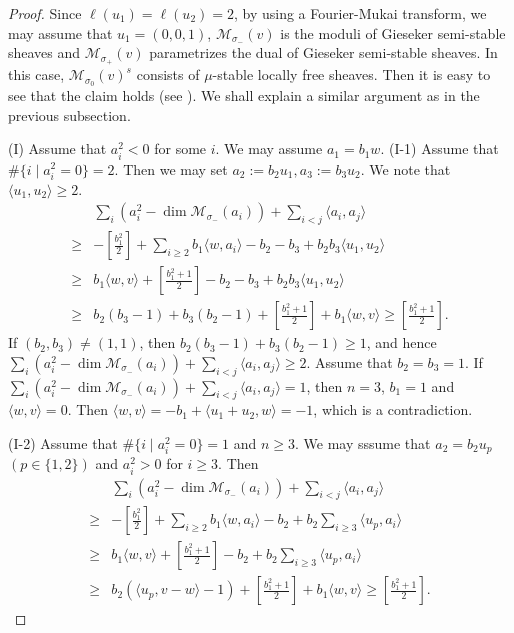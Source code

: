 \documentclass[leqno,11pt]{amsart}
\def\dim{\mathop{\mathrm{dim}}\nolimits}
\theoremstyle{definition}
\def\MM{\ensuremath{\mathcal M}}
\begin{document}
\begin{proof}
Since $\ell(u_1)=\ell(u_2)=2$,
by using a Fourier-Mukai transform,
we may assume that $u_1=(0,0,1)$, 
$\MM_{\sigma_-}(v)$ is the moduli of Gieseker semi-stable
sheaves and $\MM_{\sigma_+}(v)$ parametrizes the dual
of Gieseker semi-stable sheaves.
In this case, $\MM_{\sigma_0}(v)^s$ consists of $\mu$-stable locally free sheaves.
Then it is easy to see that the claim holds (see \cite[Thm. 2.1 Case B]{Yos16a}). 
We shall explain a similar argument as in the previous subsection. 

(I) Assume that $a_i^2<0$ for some $i$.
We may assume $a_1=b_1 w$.
(I-1)
Assume that $\#\{i \mid a_i^2=0 \}=2$.
Then we may set $a_2:=b_2 u_1, a_3:=b_3 u_2$.
We note that $\langle u_1,u_2 \rangle \geq 2$.
\begin{equation}
\begin{split}
& \sum_i(a_i^2-\dim \MM_{\sigma_-}(a_i))+\sum_{i<j}\langle a_i,a_j \rangle\\
 \geq & -[\tfrac{b_1^2}{2}]+\sum_{i \geq 2} b_1 \langle w,a_i \rangle
-b_2-b_3+b_2 b_3 \langle u_1,u_2 \rangle\\
\geq &  b_1 \langle w,v \rangle+[\tfrac{b_1^2+1}{2}] 
-b_2-b_3+b_2 b_3 \langle u_1,u_2 \rangle\\
\geq & b_2(b_3-1)+b_3(b_2-1)+[\tfrac{b_1^2+1}{2}]+b_1 \langle w,v \rangle
\geq [\tfrac{b_1^2+1}{2}].
\end{split}
\end{equation}
If $(b_2,b_3) \ne (1,1)$, then 
$b_2(b_3-1)+b_3(b_2-1) \geq 1$, and hence 
$\sum_i(a_i^2-\dim \MM_{\sigma_-}(a_i))+\sum_{i<j}\langle a_i,a_j \rangle
\geq 2$.
Assume that $b_2=b_3=1$. 
If 
$\sum_i(a_i^2-\dim \MM_{\sigma_-}(a_i))+\sum_{i<j}\langle a_i,a_j \rangle=1$,
then 
$n=3$,
$b_1=1$ and $\langle w,v \rangle=0$.
Then $\langle w,v \rangle=-b_1+\langle u_1+u_2,w \rangle=-1$,
which is a contradiction.

(I-2)
Assume that $\#\{i \mid a_i^2=0 \}=1$ and $n \geq 3$.
We may sssume that $a_2=b_2 u_p$ $(p \in \{1,2\})$ and $a_i^2>0$ 
for $i \geq 3$.
Then
\begin{equation}
\begin{split}
& \sum_i(a_i^2-\dim \MM_{\sigma_-}(a_i))+\sum_{i<j}\langle a_i,a_j \rangle\\
 \geq & -[\tfrac{b_1^2}{2}]+\sum_{i \geq 2} b_1 \langle w,a_i \rangle
-b_2+b_2 \sum_{i \geq 3}\langle u_p,a_i \rangle\\
\geq &  b_1 \langle w,v \rangle+[\tfrac{b_1^2+1}{2}] 
-b_2+b_2 \sum_{i \geq 3} \langle u_p,a_i \rangle\\
\geq & b_2(\langle u_p,v-w \rangle-1)
+[\tfrac{b_1^2+1}{2}]+b_1 \langle w,v \rangle
\geq [\tfrac{b_1^2+1}{2}].
\end{split}
\end{equation}


\end{proof}
\end{document}
